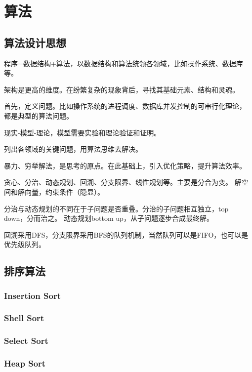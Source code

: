\chapter{算法}

\section{算法设计思想}

程序=数据结构+算法，以数据结构和算法统领各领域，比如操作系统、数据库等。

架构是更高的维度。在纷繁复杂的现象背后，寻找其基础元素、结构和灵魂。

首先，定义问题。比如操作系统的进程调度、数据库并发控制的可串行化理论，
都是典型的算法问题。

现实-模型-理论，模型需要实验和理论验证和证明。

列出各领域的关键问题，用算法思维去解决。

暴力、穷举解法，是思考的原点。在此基础上，引入优化策略，提升算法效率。

贪心、分治、动态规划、回溯、分支限界、线性规划等。主要是分合为变。
解空间和解向量，约束条件（隐显）。

分治与动态规划的不同在于子问题是否重叠。分治的子问题相互独立，top down，分而治之。
动态规划bottom up，从子问题逐步合成最终解。

回溯采用DFS，分支限界采用BFS的队列机制，当然队列可以是FIFO，也可以是优先级队列。

\section{排序算法}

\subsection{Insertion Sort}

\subsection{Shell Sort}

\subsection{Select Sort}

\subsection{Heap Sort}


